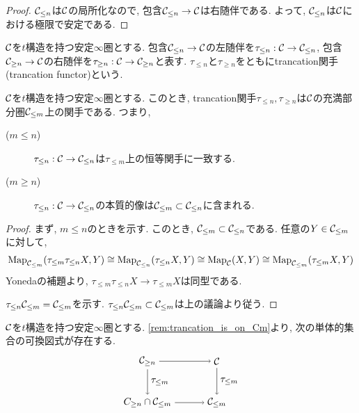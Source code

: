 \documentclass[uplatex, a4paper, 14Q, dvipdfmx]{jsarticle}
\begin{document}
\begin{proof}
  $\mathcal{C}_{\leq n}$は$\mathcal{C}$の局所化なので, 包含$\mathcal{C}_{\leq n} \to \mathcal{C}$は右随伴である. 
  よって, $\mathcal{C}_{\leq n}$は$\mathcal{C}$における極限で安定である.
\end{proof}

\begin{definition}[trancation関手]
  $\mathcal{C}$を$t$構造を持つ安定$\infty$圏とする.
  包含$\mathcal{C}_{\leq n} \to \mathcal{C}$の左随伴を$\tau_{\leq n} : \mathcal{C} \to \mathcal{C}_{\leq n}$, 包含$\mathcal{C}_{\geq n} \to \mathcal{C}$の右随伴を$\tau_{\geq n} : \mathcal{C} \to \mathcal{C}_{\geq n}$と表す.
  $\tau_{\leq n}$と$\tau_{\geq n}$をともにtrancation関手(trancation functor)という.
\end{definition}

\begin{remark} \label{rem:trancation_is_on_Cm} 
  $\mathcal{C}$を$t$構造を持つ安定$\infty$圏とする.
  このとき, trancation関手$\tau_{\leq n}, \tau_{\geq n}$は$\mathcal{C}$の充満部分圏$\mathcal{C}_{\leq m}$上の関手である. 
  つまり, 
  \begin{description}
    \item[($m \leq n$)] $\tau_{\leq n} : \mathcal{C} \to \mathcal{C}_{\leq n}$は$\tau_{\leq m}$上の恒等関手に一致する. 
    \item[($m \geq n$)] $\tau_{\leq n} : \mathcal{C} \to \mathcal{C}_{\leq n}$の本質的像は$\mathcal{C}_{\leq m} \subset \mathcal{C}_{\leq n}$に含まれる. 
  \end{description}
\end{remark}

\begin{proof}
  まず, $m \leq n$のときを示す. 
  このとき, $\mathcal{C}_{\leq m} \subset \mathcal{C}_{\leq n}$である. 
  任意の$Y \in \mathcal{C}_{\leq m}$に対して, 
  \begin{align*}
    \mathrm{Map}_{\mathcal{C}_{\leq m}}(\tau_{\leq m}\tau_{\leq n}X,Y)
    \cong \mathrm{Map}_{\mathcal{C}_{\leq n}} (\tau_{\leq n}X,Y) 
    \cong \mathrm{Map}_{\mathcal{C}}(X,Y) 
    \cong \mathrm{Map}_{\mathcal{C}_{\leq m}}(\tau_{\leq m}X,Y)
  \end{align*}
  Yonedaの補題より, $\tau_{\leq m}\tau_{\leq n}X \to \tau_{\leq m}X$は同型である. 
  
  $\tau_{\leq n}\mathcal{C}_{\leq m} = \mathcal{C}_{\leq m}$を示す.
  $\tau_{\leq n}\mathcal{C}_{\leq m} \subset \mathcal{C}_{\leq m}$は上の議論より従う. 
\end{proof}

\begin{corollary}
  $\mathcal{C}$を$t$構造を持つ安定$\infty$圏とする.
  \cref{rem:trancation_is_on_Cm}より, 次の単体的集合の可換図式が存在する.
  \[
    \begin{tikzpicture}[auto,->]
      \node (CnCm) at (0,0) {$C_{\geq n} \cap \C_{\leq m}$};
      \node (Cm) at (2.5,0) {$\C_{\leq m}$};
      \node (Cn) at (0,1.5) {$\C_{\geq n}$};
      \node (C) at (2.5,1.5) {$\C$};
      \draw (Cn) -- (C);
      \draw (Cn) -- node {$\tau_{\leq m}$} (CnCm);
      \draw (C) -- node {$\tau_{\leq m}$} (Cm);
      \draw (CnCm) -- (Cm);
    \end{tikzpicture}
  \]
\end{corollary}
\end{document}
